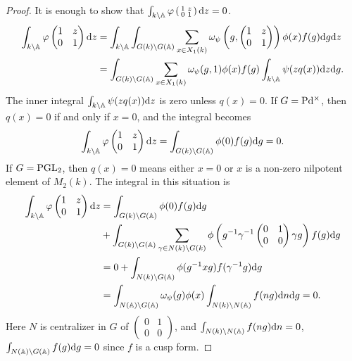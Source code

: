 \begin{proof}
It is enough to show that $\int_{k\backslash \mathbb{A}} \varphi\left(\begin{smallmatrix}
    1 & z \\ 0 & 1
\end{smallmatrix}\right)\mathrm{d} z = 0$.
\begin{align*}
\int_{k \backslash \mathbb{A}} \varphi \begin{pmatrix}
    1 & z \\ 0 & 1
\end{pmatrix} \mathrm{d} z &= \int_{k \backslash \mathbb{A}} \int_{G(k) \backslash G(\mathbb{A})}  \sum_{x \in X_1(k)} \omega_\psi\left(g, \begin{pmatrix}
    1 & z \\ 0 & 1
\end{pmatrix}\right)\phi(x) f(g) \mathrm{d} g \mathrm{d} z \\
&= \int_{G(k) \backslash G(\mathbb{A})} \sum_{x \in X_1(k)} \omega_\psi(g, 1) \phi(x) f(g) \int_{k \backslash \mathbb{A}} \psi(z q(x)) \mathrm{d} z \mathrm{d} g.
\end{align*}
The inner integral $\int_{k \backslash \mathbb{A}} \psi(z q(x)) \mathrm{d} z$ is zero unless $q(x) = 0$.
If $G = \mathrm{P} \mathrm{d}^\times$, then $q(x) = 0$ if and only if $x = 0$, and the integral becomes
\[
\int_{k \backslash \mathbb{A}} \varphi \begin{pmatrix}
    1 & z \\ 0 & 1
\end{pmatrix} \mathrm{d} z = \int_{G(k) \backslash G(\mathbb{A})} \phi(0) f(g) \mathrm{d} g = 0.
\]
If $G = \mathrm{PGL}_2$, then $q(x)=0$ means either $x = 0$ or $x$ is a non-zero nilpotent element of $M_2(k)$. The integral in this situation is
\begin{align*}
    \int_{k \backslash \mathbb{A}} \varphi \begin{pmatrix}
        1 & z \\ 0 & 1
    \end{pmatrix} \mathrm{d} z &= \int_{G(k) \backslash G(\mathbb{A})} \phi(0) f(g) \mathrm{d} g \\
    &+ \int_{G(k) \backslash G(\mathbb{A})} \sum_{\gamma \in N(k) \backslash G(k)} \phi \left(g^{-1} \gamma^{-1} \begin{pmatrix}
        0 & 1 \\ 0 & 0
    \end{pmatrix} \gamma g\right) f(g) \mathrm{d} g \\
    &= 0 + \int_{N(k) \backslash G(\mathbb{A})} \phi(g^{-1} xg) f(\gamma^{-1} g) \mathrm{d} g \\
    &= \int_{N(\mathbb{A}) \backslash G(\mathbb{A})} \omega_\psi(g) \phi(x) \int_{N(k) \backslash N(\mathbb{A})} f(ng) \mathrm{d} n \mathrm{d} g = 0.
\end{align*}
Here $N$ is centralizer in $G$ of $\left(\begin{smallmatrix}
    0 & 1 \\ 0& 0
\end{smallmatrix}\right)$, and $\int_{N(k) \backslash N(\mathbb{A})} f(ng) \mathrm{d} n = 0$, $\int_{N(\mathbb{A}) \backslash G(\mathbb{A})} f(g) \mathrm{d} g = 0$  since $f$ is a cusp form.
\end{proof}

